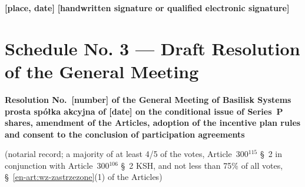 \documentclass[11pt,a4paper]{report}
\newcommand{\field}[1]{\textbf{[#1]}}
\newcommand{\CompanyFull}{Basilisk Systems prosta spółka akcyjna}
\newcommand{\US}[1]{\S~#1 of the Articles}
\begin{document}
\field{place, date} \hfill \field{handwritten signature or qualified electronic signature}

\chapter*{Schedule No. 3 --- Draft Resolution of the General Meeting}

\textbf{Resolution No.~\field{number} of the General Meeting of \CompanyFull{} of \field{date} on the conditional issue of Series~P shares, amendment of the Articles, adoption of the incentive plan rules and consent to the conclusion of participation agreements}

{\small (notarial record; a majority of at least 4/5 of the votes, Article~300$^{115}$ \S~2 in conjunction with Article~300$^{106}$ \S~2 KSH, and not less than 75\% of all votes, \US{\ref{en-art:wz-zastrzezone}(1)})\par}
\end{document}
